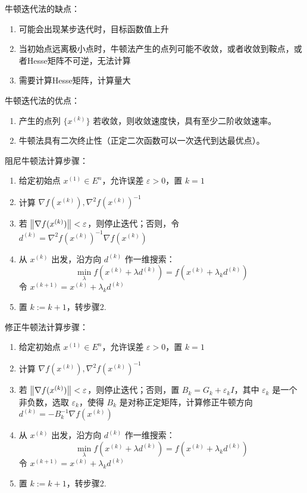 \begin{remark}
    牛顿迭代法的缺点：\begin{enumerate}
        \item 可能会出现某步迭代时，目标函数值上升
        \item 当初始点远离极小点时，牛顿法产生的点列可能不收敛，或者收敛到鞍点，或者Hesse矩阵不可逆，无法计算
        \item 需要计算Hesse矩阵，计算量大
    \end{enumerate}
    牛顿迭代法的优点：\begin{enumerate}
        \item 产生的点列 $\{x^{(k)}\}$ 若收敛，则收敛速度快，具有至少二阶收敛速率。
        \item 牛顿法具有二次终止性（正定二次函数可以一次迭代到达最优点）。
    \end{enumerate}
\end{remark}

\begin{remark}
    阻尼牛顿法计算步骤：\begin{enumerate}
        \item 给定初始点 $x^{(1)} \in E^n$，允许误差 $\varepsilon > 0$，置 $k = 1$
        \item 计算 $\nabla f(x^{(k)}), \nabla^2f(x^{(k)})^{-1}$
        \item 若 $\norm{\nabla f(x^{(k)})} < \varepsilon$，则停止迭代；否则，令 $d^{(k)} = \nabla^2f(x^{(k)})^{-1}\nabla f(x^{(k)})$
        \item 从 $x^{(k)}$ 出发，沿方向 $d^{(k)}$ 作一维搜索：\[\min_{\lambda} f(x^{(k)} + \lambda d^{(k)}) = f(x^{(k)} + \lambda_k d^{(k)})\] 令 $x^{(k + 1)} = x^{(k)} + \lambda_k d^{(k)}$
        \item 置 $k := k + 1$，转步骤2.
    \end{enumerate}
\end{remark}

\begin{remark}
    修正牛顿法计算步骤：\begin{enumerate}
        \item 给定初始点 $x^{(1)} \in E^n$，允许误差 $\varepsilon > 0$，置 $k = 1$
        \item 计算 $\nabla f(x^{(k)}), \nabla^2f(x^{(k)})^{-1}$
        \item 若 $\norm{\nabla f(x^{(k)})} < \varepsilon$，则停止迭代；否则，置 $B_k = G_k + \varepsilon_k I$，其中 $\varepsilon_k$ 是一个非负数，选取 $\varepsilon_k$，使得 $B_k$ 是对称正定矩阵，计算修正牛顿方向 $d^{(k)} = -B_k^{-1}\nabla f(x^{(k)})$
        \item 从 $x^{(k)}$ 出发，沿方向 $d^{(k)}$ 作一维搜索：\[\min_{\lambda} f(x^{(k)} + \lambda d^{(k)}) = f(x^{(k)} + \lambda_k d^{(k)})\] 令 $x^{(k + 1)} = x^{(k)} + \lambda_k d^{(k)}$
        \item 置 $k := k + 1$，转步骤2.
    \end{enumerate}
\end{remark}


